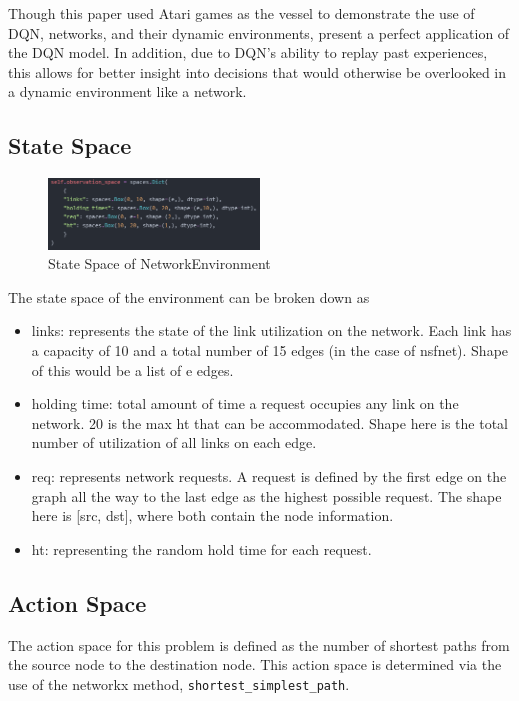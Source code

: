 \documentclass[conference]{IEEEtran}
\begin{document}
Though this paper used Atari games as the vessel to demonstrate the use of DQN, networks, and their dynamic environments, present a perfect application of the DQN model. In addition, due to DQN's ability to replay past experiences, this allows for better insight into decisions that would otherwise be overlooked in a dynamic environment like a network. 
\subsection{State Space}
\begin{figure} [ht]
    \centering
    \includegraphics[width = 0.5\textwidth]{space.png}
    \caption{State Space of NetworkEnvironment}
    \label{fig:reward}
\end{figure}
The state space of the environment can be broken down as
\begin{itemize}
    \item links: represents the state of the link utilization on the network. Each link has a capacity of 10 and a total number of 15 edges (in the case of nsfnet). Shape of this would be a list of e edges.
    \item holding time: total amount of time a request occupies any link on the network. 20 is the max ht that can be accommodated. Shape here is the total number of utilization of all links on each edge.
    \item req: represents network requests. A request is defined by the first edge on the graph all the way to the last edge as the highest possible request. The shape here is [src, dst], where both contain the node information.
    \item ht: representing the random hold time for each request.
    
\end{itemize}
\subsection{Action Space}
The action space for this problem is defined as the number of shortest paths from the source node to the destination node. This action space is determined via the use of the networkx method, \texttt{shortest\_simplest\_path}.
\end{document}
